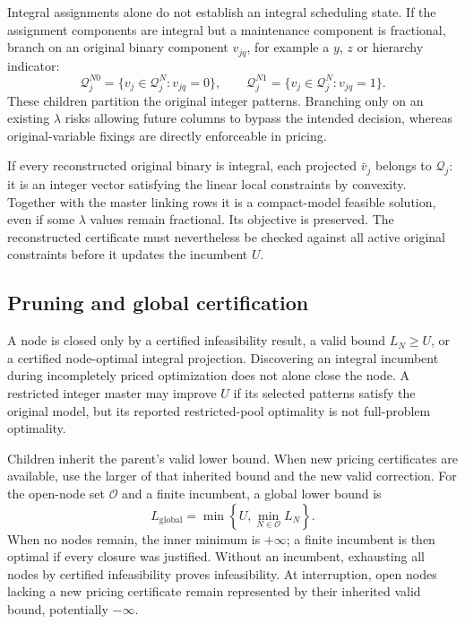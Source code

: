 Integral assignments alone do not establish an integral scheduling state.
If the assignment components are integral but a maintenance component is
fractional, branch on an original binary component $v_{jq}$, for example a
$y$, $z$ or hierarchy indicator:
\begin{equation}
 \mathcal Q_j^{N0}=\{v_j\in\mathcal Q_j^N:v_{jq}=0\},\qquad
 \mathcal Q_j^{N1}=\{v_j\in\mathcal Q_j^N:v_{jq}=1\}.
 \label{eq:bp_general_branch}
\end{equation}
These children partition the original integer patterns. Branching only on an
existing $\lambda$ risks allowing future columns to bypass the intended
decision, whereas original-variable fixings are directly enforceable in
pricing.

If every reconstructed original binary is integral, each projected $\bar v_j$
belongs to $\mathcal Q_j$: it is an integer vector satisfying the linear
local constraints by convexity. Together with the master linking rows it is
a compact-model feasible solution, even if some $\lambda$ values remain
fractional. Its objective is preserved. The reconstructed certificate must
nevertheless be checked against all active original constraints before it
updates the incumbent $U$.

\subsection{Pruning and global certification}

A node is closed only by a certified infeasibility result, a valid bound
$L_N\ge U$, or a certified node-optimal integral projection. Discovering an
integral incumbent during incompletely priced optimization does not alone
close the node. A restricted integer master may improve $U$ if its selected
patterns satisfy the original model, but its reported restricted-pool
optimality is not full-problem optimality.

Children inherit the parent's valid lower bound. When new pricing certificates
are available, use the larger of that inherited bound and the new valid
correction. For the open-node set $\mathcal O$ and a finite incumbent, a global
lower bound is
\begin{equation}
 L_{\mathrm{global}}=\min\left\{U,\min_{N\in\mathcal O}L_N\right\}.
 \label{eq:bp_global_lb}
\end{equation}
When no nodes remain, the inner minimum is $+\infty$; a finite incumbent is
then optimal if every closure was justified. Without an incumbent, exhausting
all nodes by certified infeasibility proves infeasibility. At interruption,
open nodes lacking a new pricing certificate remain represented by their
inherited valid bound, potentially $-\infty$.

